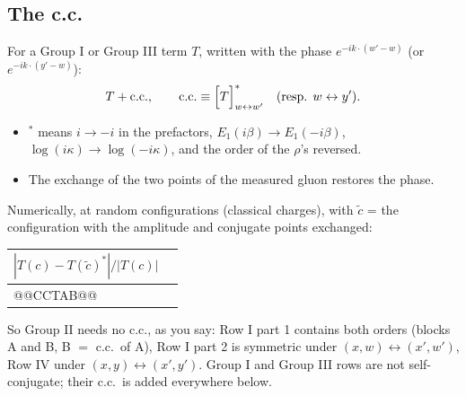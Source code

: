 \documentclass[10pt]{article}
\numberwithin{equation}{section}
\newcommand{\phw}{e^{-ik\cdot(w'-w)}}
\begin{document}
\subsection{The c.c.}\label{sec:cc}
For a Group I or Group III term $T$, written with the phase $\phw$ (or $e^{-ik\cdot(y'-w)}$):
\begin{equation*}
T+{\rm c.c.},\qquad {\rm c.c.}\equiv\Big[T\Big]^*_{w\leftrightarrow w'}\quad(\text{resp. }w\leftrightarrow y').
\end{equation*}
\begin{itemize}
\item $^*$ means $i\to-i$ in the prefactors, $E_1(i\beta)\to E_1(-i\beta)$, $\log(i\kappa)\to\log(-i\kappa)$, and the order of the $\rho$'s reversed.
\item The exchange of the two points of the measured gluon restores the phase.
\end{itemize}
Numerically, at random configurations (classical charges), with $\tilde c$ = the configuration with the amplitude and conjugate points exchanged:
\begin{center}\small
\begin{tabular}{@{}lc@{}}\toprule
$|T(c)-T(\tilde c)^*|/|T(c)|$ & \\\midrule
@@CCTAB@@
\bottomrule
\end{tabular}
\end{center}
So Group II needs no c.c., as you say: Row I part 1 contains both orders (blocks A and B, B $=$ c.c.\ of A), Row I part 2 is symmetric under $(x,w)\leftrightarrow(x',w')$, Row IV under $(x,y)\leftrightarrow(x',y')$. Group I and Group III rows are not self-conjugate; their c.c.\ is added everywhere below.

\end{document}
